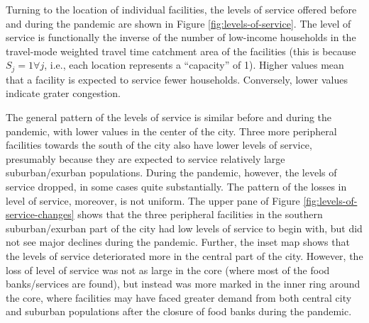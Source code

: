 \documentclass[]{elsarticle} %
\begin{document}
Turning to the location of individual facilities, the levels of service
offered before and during the pandemic are shown in Figure
\ref{fig:levels-of-service}. The level of service is functionally the
inverse of the number of low-income households in the travel-mode
weighted travel time catchment area of the facilities (this is because
\(S_j=1 \forall j\), i.e., each location represents a ``capacity'' of
1). Higher values mean that a facility is expected to service fewer
households. Conversely, lower values indicate grater congestion.

The general pattern of the levels of service is similar before and
during the pandemic, with lower values in the center of the city. Three
more peripheral facilities towards the south of the city also have lower
levels of service, presumably because they are expected to service
relatively large suburban/exurban populations. During the pandemic,
however, the levels of service dropped, in some cases quite
substantially. The pattern of the losses in level of service, moreover,
is not uniform. The upper pane of Figure
\ref{fig:levels-of-service-changes} shows that the three peripheral
facilities in the southern suburban/exurban part of the city had low
levels of service to begin with, but did not see major declines during
the pandemic. Further, the inset map shows that the levels of service
deteriorated more in the central part of the city. However, the loss of
level of service was not as large in the core (where most of the food
banks/services are found), but instead was more marked in the inner ring
around the core, where facilities may have faced greater demand from
both central city and suburban populations after the closure of food
banks during the pandemic.
\end{document}
